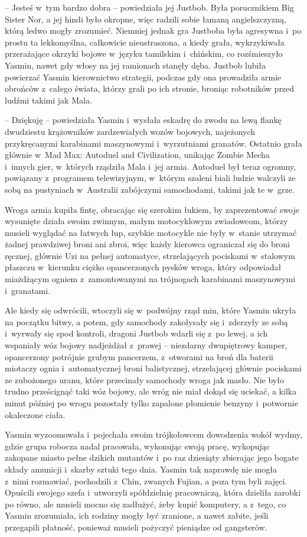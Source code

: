 \documentclass[oneside,polish,11pt,rmheadings]{mwbk}
\begin{document}
-- Jesteś w~tym bardzo dobra -- powiedziała jej Justbob. Była porucznikiem Big Sister Nor, a jej hindi było okropne, więc radzili sobie łamaną angielszczyzną, którą ledwo mogły zrozumieć. Niemniej jednak gra Justboba była agresywna i~po prostu ta lekkomyślna, całkowicie nieustraszona, a kiedy grała, wykrzykiwała przerażające okrzyki bojowe w~języku tamilskim i~chińskim, co rozśmieszyło Yasmin, nawet gdy włosy na jej ramionach stanęły dęba. Justbob lubiła powierzać Yasmin kierownictwo strategii, podczas gdy ona prowadziła armie obrońców z~całego świata, którzy grali po ich stronie, broniąc robotników przed ludźmi takimi jak Mala.

-- Dziękuję -- powiedziała Yasmin i~wysłała eskadrę do zwodu na lewą flankę dwudziestu krążowników zardzewiałych wozów bojowych, najeżonych przykręcanymi karabinami maszynowymi i~wyrzutniami granatów. Ostatnio grała głównie w~Mad Max: Autoduel and Civilization, unikając Zombie Mecha i~innych gier, w~których rządziła Mala i~jej armia. Autoduel był teraz ogromny, powiązany z~programem telewizyjnym, w~którym szaleni biali ludzie walczyli ze sobą na pustyniach w~Australii zabójczymi samochodami, takimi jak te w~grze.

Wroga armia kupiła fintę, obracając się szerokim łukiem, by zaprezentować swoje wysunięte działa swoim zwinnym, małym motocyklowym zwiadowcom, którzy musieli wyglądać na łatwych łup, szybkie motocykle nie były w~stanie utrzymać żadnej prawdziwej broni ani zbroi, więc każdy kierowca ograniczał się do broni ręcznej, głównie Uzi na pełnej automatyce, strzelających pociskami w~stalowym płaszczu w~kierunku ciężko opancerzonych pysków wroga, który odpowiadał miażdżącym ogniem z~zamontowanymi na trójnogach karabinami maszynowymi i~granatami.

Ale kiedy się odwrócili, wtoczyli się w~podwójny rząd min, które Yasmin ukryła na początku bitwy, a potem, gdy samochody zakołysały się i~zderzyły ze sobą i~wyrwały się spod kontroli, dragoni Justbob wdarli się z~po lewej, a ich wspaniały wóz bojowy nadjeżdżał z~prawej -- niezdarny dwupiętrowy kamper, opancerzony potrójnie grubym pancerzem, z~otworami na broń dla baterii miotaczy ognia i~automatycznej broni balistycznej, strzelającej głównie pociskami ze zubożonego uranu, które przecinały samochody wroga jak masło. Nie było trudno prześcignąć taki wóz bojowy, ale wróg nie miał dokąd się uciekać, a kilka minut później po wrogu pozostały tylko zapalone płomienie benzyny i~potwornie okaleczone ciała.

Yasmin wyzoomowała i~pojechała swoim trójkołowcem dowodzenia wokół wydmy, gdzie grupa robocza nadal pracowała, wykonując swoją pracę, wykopując zakopane miasto pełne dzikich mutantów i~po raz dziesiąty zbierając jego bogate składy amunicji i~skarby sztuki tego dnia. Yasmin tak naprawdę nie mogła z~nimi rozmawiać, pochodzili z~Chin, zwanych Fujian, a poza tym byli zajęci. Opuścili swojego szefa i~utworzyli spółdzielnię pracowniczą, która dzieliła zarobki po równo, ale musieli mocno się zadłużyć, żeby kupić komputery, a z~tego, co Yasmin zrozumiała, ich rodziny mogły być zranione, a nawet zabite, jeśli przegapili płatność, ponieważ musieli pożyczyć pieniądze od gangsterów.
\end{document}
